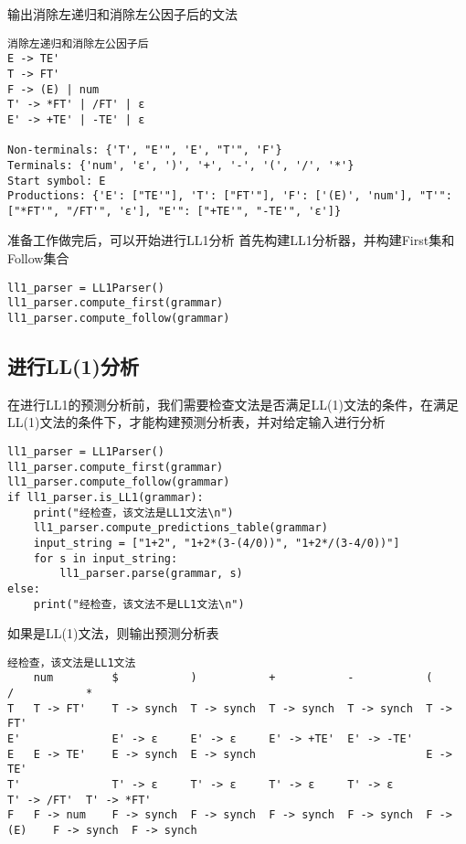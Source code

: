 \documentclass[lang=cn,11pt,a4paper]{elegantpaper}
\begin{document}
输出消除左递归和消除左公因子后的文法

\begin{lstlisting}[language=text]
消除左递归和消除左公因子后
E -> TE'
T -> FT'
F -> (E) | num
T' -> *FT' | /FT' | ε
E' -> +TE' | -TE' | ε

Non-terminals: {'T', "E'", 'E', "T'", 'F'}
Terminals: {'num', 'ε', ')', '+', '-', '(', '/', '*'}
Start symbol: E
Productions: {'E': ["TE'"], 'T': ["FT'"], 'F': ['(E)', 'num'], "T'": ["*FT'", "/FT'", 'ε'], "E'": ["+TE'", "-TE'", 'ε']} 
\end{lstlisting}

准备工作做完后，可以开始进行LL1分析
首先构建LL1分析器，并构建First集和Follow集合
\begin{lstlisting}
ll1_parser = LL1Parser()
ll1_parser.compute_first(grammar)
ll1_parser.compute_follow(grammar)
\end{lstlisting}

\subsection{进行LL(1)分析}

在进行LL1的预测分析前，我们需要检查文法是否满足LL(1)文法的条件，在满足LL(1)文法的条件下，才能构建预测分析表，并对给定输入进行分析
\begin{lstlisting}
ll1_parser = LL1Parser()
ll1_parser.compute_first(grammar)
ll1_parser.compute_follow(grammar)
if ll1_parser.is_LL1(grammar):
    print("经检查，该文法是LL1文法\n")
    ll1_parser.compute_predictions_table(grammar)
    input_string = ["1+2", "1+2*(3-(4/0))", "1+2*/(3-4/0))"]
    for s in input_string:
        ll1_parser.parse(grammar, s)
else:
    print("经检查，该文法不是LL1文法\n")

\end{lstlisting}

如果是LL(1)文法，则输出预测分析表
\begin{lstlisting}[language = text]
经检查，该文法是LL1文法
	num       	$         	)         	+         	-         	(         	/         	*         
T	T -> FT'  	T -> synch	T -> synch	T -> synch	T -> synch	T -> FT'  	          	          
E'	          	E' -> ε   	E' -> ε   	E' -> +TE'	E' -> -TE'	          	          	          
E	E -> TE'  	E -> synch	E -> synch	          	          	E -> TE'  	          	          
T'	          	T' -> ε   	T' -> ε   	T' -> ε   	T' -> ε   	          	T' -> /FT'	T' -> *FT'
F	F -> num  	F -> synch	F -> synch	F -> synch	F -> synch	F -> (E)  	F -> synch	F -> synch
\end{lstlisting}
\end{document}
